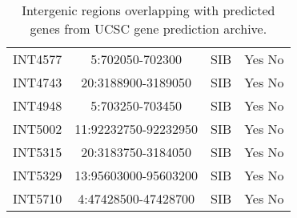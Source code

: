 \begin{table}[h]
\begin{tabular}{lccc}
	INT4577 & 5:702050-702300 & SIB & Yes No \\
	INT4743 & 20:3188900-3189050 & SIB & Yes No \\
	INT4948 & 5:703250-703450 & SIB & Yes No \\
	INT5002 & 11:92232750-92232950 & SIB & Yes No \\
	INT5315 & 20:3183750-3184050 & SIB & Yes No \\
	INT5329 & 13:95603000-95603200 & SIB & Yes No \\
	INT5710 & 4:47428500-47428700 & SIB & Yes No \\
        \bottomrule
    \end{tabular}
    \caption{Intergenic regions overlapping with predicted genes from UCSC gene prediction archive.}
    \label{tab:predictionToolsIntergenic}
\end{table}
